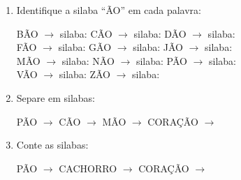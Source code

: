 \begin{exercicio}
\begin{enumerate}
  \item Identifique a silaba ``ÃO'' em cada palavra:
  \begin{center}
  BÃO $\rightarrow$ silaba: \underline{\hspace{1cm}} \quad CÃO $\rightarrow$ silaba: \underline{\hspace{1cm}} \quad DÃO $\rightarrow$ silaba: \underline{\hspace{1cm}} \\
  FÃO $\rightarrow$ silaba: \underline{\hspace{1cm}} \quad GÃO $\rightarrow$ silaba: \underline{\hspace{1cm}} \quad JÃO $\rightarrow$ silaba: \underline{\hspace{1cm}} \\
  MÃO $\rightarrow$ silaba: \underline{\hspace{1cm}} \quad NÃO $\rightarrow$ silaba: \underline{\hspace{1cm}} \quad PÃO $\rightarrow$ silaba: \underline{\hspace{1cm}} \\
  VÃO $\rightarrow$ silaba: \underline{\hspace{1cm}} \quad ZÃO $\rightarrow$ silaba: \underline{\hspace{1cm}}
  \end{center}

  \item Separe em silabas:
  \begin{center}
  PÃO $\rightarrow$ \underline{\hspace{1cm}} \quad CÃO $\rightarrow$ \underline{\hspace{1cm}} \quad MÃO $\rightarrow$ \underline{\hspace{1cm}} \quad CORAÇÃO $\rightarrow$ \underline{\hspace{1cm}} \underline{\hspace{1cm}} \underline{\hspace{1cm}}
  \end{center}

  \item Conte as silabas:
  \begin{center}
  PÃO $\rightarrow$ \underline{\hspace{1cm}} \quad CACHORRO $\rightarrow$ \underline{\hspace{1cm}} \quad CORAÇÃO $\rightarrow$ \underline{\hspace{1cm}}
  \end{center}
\end{enumerate}


\end{exercicio}
